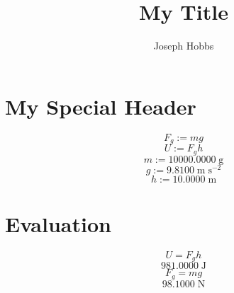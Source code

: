 \documentclass[12pt]{article}
\begin{document}
\title{\textbf{My Title}}
\author{Joseph Hobbs}
\maketitle


\section{My Special Header}


$$
F_{g} := m g
$$
$$
U := F_{g} h
$$
$$
m := 10000.0000 \; \mathrm{g}
$$
$$
g := 9.8100 \; \mathrm{m} \; \mathrm{s^{-2}}
$$
$$
h := 10.0000 \; \mathrm{m}
$$


\section{Evaluation}


$$
U = F_{g} h
$$
$$
981.0000 \; \mathrm{J}
$$
$$
F_{g} = m g
$$
$$
98.1000 \; \mathrm{N}
$$
\end{document}
